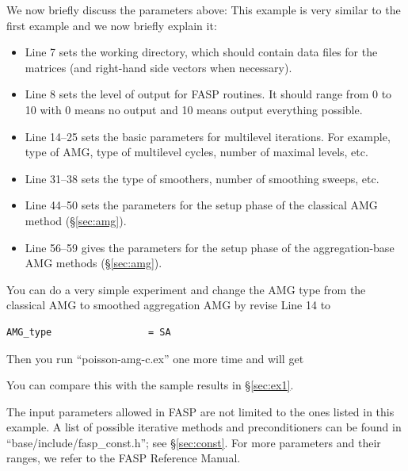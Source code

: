 \documentclass[11pt]{memoir}
\begin{document}
We now briefly discuss the parameters above:
%
This example is very similar to the first example and we now briefly explain it:
\begin{itemize}
%
\item Line 7 sets the working directory, which should contain data files for the matrices (and right-hand side vectors when necessary).
%
\item Line 8 sets the level of output for FASP routines. It should range from 0 to 10 with 0 means no output and 10 means output everything possible.
%
\item Line 14--25 sets the basic parameters for multilevel iterations. For example, type of AMG, type of multilevel cycles, number of maximal levels, etc.
%
\item Line 31--38 sets the type of smoothers, number of smoothing sweeps, etc.
%
\item Line 44--50 sets the parameters for the setup phase of the classical AMG method (\S\ref{sec:amg}).
%
\item Line 56--59 gives the parameters for the setup phase of the aggregation-base AMG methods (\S\ref{sec:amg}).
%
\end{itemize}
%

You can do a very simple experiment and change the AMG type from the classical AMG to smoothed aggregation AMG by revise Line 14 to
%
\begin{lstlisting}[numbers=none]
AMG_type                 = SA
\end{lstlisting}
%
Then you run ``poisson-amg-c.ex'' one more time and will get
%

%
You can compare this with the sample results in \S\ref{sec:ex1}.

\begin{snugshade}\noindent  
The input parameters allowed in FASP are not limited to the ones listed in this example. A list of possible iterative methods and preconditioners can be found in ``base/include/fasp\_const.h''; see \S\ref{sec:const}. For more parameters and their ranges, we refer to the FASP Reference Manual.
\end{snugshade}
\end{document}
